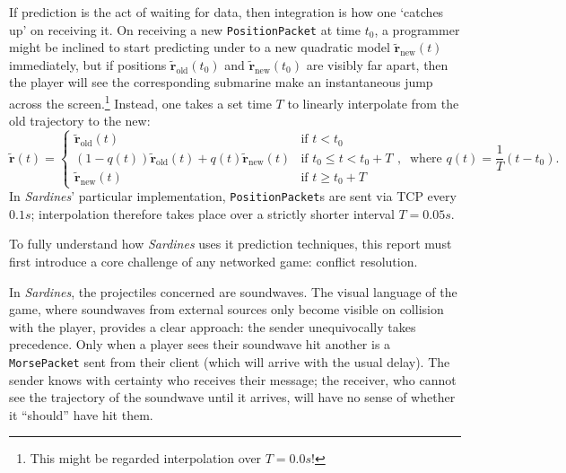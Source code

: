 \documentclass[a4paper, 10pt]{article}
\begin{document}
\begin{flushleft}
\vspace{5pt}\noindent
If prediction is the act of waiting for data, then integration is how one `catches up' on receiving it. On receiving a new \texttt{PositionPacket} at time $t_0$, a programmer might be inclined to start predicting under to a new quadratic model $\mathbf{\tilde{r}}_{\textrm{new}}(t)$ immediately, but if positions $\mathbf{\tilde{r}}_{\textrm{old}}(t_0)$ and $\mathbf{\tilde{r}}_{\textrm{new}}(t_0)$ are visibly far apart, then the player will see the corresponding submarine make an instantaneous jump across the screen.\footnote{This might be regarded interpolation over $T = 0.0s$!} Instead, one takes a set time $T$ to linearly interpolate from the old trajectory to the new:
$$\mathbf{\tilde{r}}(t) = \begin{cases} 
\mathbf{\tilde{r}}_{\textrm{old}}(t) & \textrm{if $t < t_0$} \\
(1-q(t))\mathbf{\tilde{r}}_{\textrm{old}}(t) + q(t)\mathbf{\tilde{r}}_{\textrm{new}}(t) & \textrm{if $t_0 \leq t < t_0+T$} \\
\mathbf{\tilde{r}}_{\textrm{new}}(t) & \textrm{if $t \geq t_0+T$}
\end{cases}, \;\; \textrm{where $q(t) = \frac{1}{T}\left(t-t_0\right)$.}$$
In \textit{Sardines}' particular implementation, \texttt{PositionPacket}s are sent via TCP every $0.1s$; interpolation therefore takes place over a strictly shorter interval $T = 0.05s$. 

\vspace{5pt}

\vspace{5pt}\noindent
To fully understand how \textit{Sardines} uses it prediction techniques, this report must first introduce a core challenge of any networked game: conflict resolution.

\vspace{5pt}\noindent
In \textit{Sardines}, the projectiles concerned are soundwaves. The visual language of the game, where soundwaves from external sources only become visible on collision with the player, provides a clear approach: the sender unequivocally takes precedence. Only when a player sees their soundwave hit another is a \texttt{MorsePacket} sent from their client (which will arrive with the usual delay). The sender knows with certainty who receives their message; the receiver, who cannot see the trajectory of the soundwave until it arrives, will have no sense of whether it ``should'' have hit them.


\end{flushleft}
\end{document}
